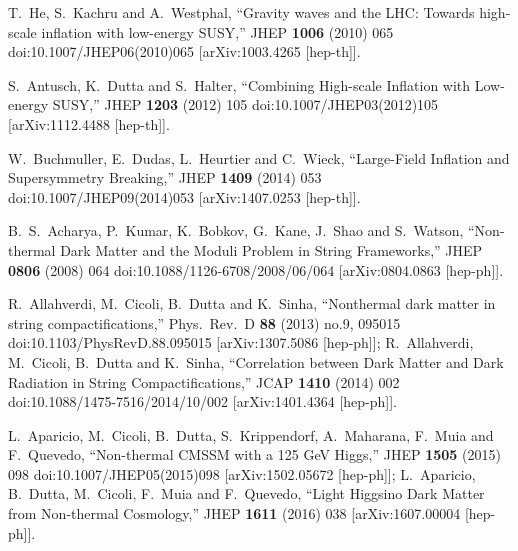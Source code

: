 \documentclass[11pt,a4paper]{article}
\begin{document}
\begin{thebibliography}{99}
  T.~He, S.~Kachru and A.~Westphal,
  ``Gravity waves and the LHC: Towards high-scale inflation with low-energy SUSY,''
  JHEP {\bf 1006} (2010) 065
  doi:10.1007/JHEP06(2010)065
  [arXiv:1003.4265 [hep-th]].

  S.~Antusch, K.~Dutta and S.~Halter,
  ``Combining High-scale Inflation with Low-energy SUSY,''
  JHEP {\bf 1203} (2012) 105
  doi:10.1007/JHEP03(2012)105
  [arXiv:1112.4488 [hep-th]].

  W.~Buchmuller, E.~Dudas, L.~Heurtier and C.~Wieck,
  ``Large-Field Inflation and Supersymmetry Breaking,''
  JHEP {\bf 1409} (2014) 053
  doi:10.1007/JHEP09(2014)053
  [arXiv:1407.0253 [hep-th]].

  B.~S.~Acharya, P.~Kumar, K.~Bobkov, G.~Kane, J.~Shao and S.~Watson,
  ``Non-thermal Dark Matter and the Moduli Problem in String Frameworks,''
  JHEP {\bf 0806} (2008) 064
  doi:10.1088/1126-6708/2008/06/064
  [arXiv:0804.0863 [hep-ph]].

  R.~Allahverdi, M.~Cicoli, B.~Dutta and K.~Sinha,
  ``Nonthermal dark matter in string compactifications,''
  Phys.\ Rev.\ D {\bf 88} (2013) no.9,  095015
  doi:10.1103/PhysRevD.88.095015
  [arXiv:1307.5086 [hep-ph]];
R.~Allahverdi, M.~Cicoli, B.~Dutta and K.~Sinha,
  ``Correlation between Dark Matter and Dark Radiation in String Compactifications,''
  JCAP {\bf 1410} (2014) 002
  doi:10.1088/1475-7516/2014/10/002
  [arXiv:1401.4364 [hep-ph]].

  L.~Aparicio, M.~Cicoli, B.~Dutta, S.~Krippendorf, A.~Maharana, F.~Muia and F.~Quevedo,
  ``Non-thermal CMSSM with a 125 GeV Higgs,''
  JHEP {\bf 1505} (2015) 098
  doi:10.1007/JHEP05(2015)098
  [arXiv:1502.05672 [hep-ph]];
  L.~Aparicio, B.~Dutta, M.~Cicoli, F.~Muia and F.~Quevedo,
  ``Light Higgsino Dark Matter from Non-thermal Cosmology,''
  JHEP {\bf 1611} (2016) 038
  [arXiv:1607.00004 [hep-ph]].


\end{thebibliography}
\end{document}
